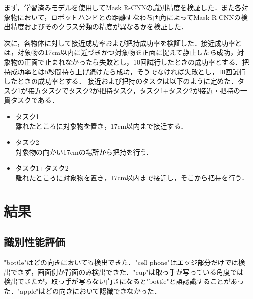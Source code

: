 まず，学習済みモデルを使用してMask R-CNNの識別精度を検証した．また各対象物において，ロボットハンドとの距離すなわち画角によってMask R-CNNの検出精度およびそのクラス分類の精度が異なるかを検証した．

次に，各物体に対して接近成功率および把持成功率を検証した．接近成功率とは，対象物の17cm以内に近づきかつ対象物を正面に捉えて静止したら成功，対象物の正面で止まれなかったら失敗とし，10回試行したときの成功率とする．把持成功率とは5秒間持ち上げ続けたら成功，そうでなければ失敗とし，10回試行したときの成功率とする．
接近および把持のタスクは以下のように定めた．タスク1が接近タスクでタスク2が把持タスク，タスク1+タスク2が接近・把持の一貫タスクである．
\begin{itemize}
    \item タスク1\\
    離れたところに対象物を置き，17cm以内まで接近する．
    \item タスク2\\
    対象物の向かい17cmの場所から把持を行う．
    \item タスク1+タスク2\\
    離れたところに対象物を置き，17cm以内まで接近し，そこから把持を行う．
\end{itemize}


\section{結果}
\subsection{識別性能評価}
"bottle"はどの向きにおいても検出できた．"cell phone"はエッジ部分だけでは検出できず，画面側か背面のみ検出できた．"cup"は取っ手が写っている角度では検出できたが，取っ手が写らない向きになると"bottle"と誤認識することがあった．"apple"はどの向きにおいて認識できなかった．

